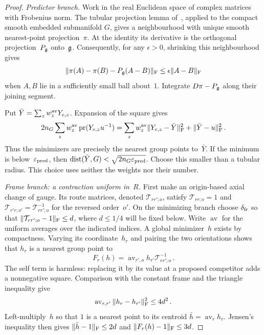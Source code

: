 \begin{proof}
\emph{Predictor branch.} Work in the real Euclidean space of complex matrices with Frobenius norm. The tubular projection lemma of~\cite[p.~153, Lemma]{Foote1984}, applied to the compact smooth embedded submanifold $G$, gives a neighbourhood with unique smooth nearest-point projection~$\pi$. At the identity its derivative is the orthogonal projection~$P_{\mathfrak{g}}$ onto~$\mathfrak{g}$. Consequently, for any $\epsilon>0$, shrinking this neighbourhood gives
\begin{equation}\label{eq:B-projection}
\|\pi(A)-\pi(B)-P_{\mathfrak{g}}(A-B)\|_{\rm F}\le\epsilon\|A-B\|_{\rm F}
\end{equation}
when $A,B$ lie in a sufficiently small ball about~$1$. Integrate $D\pi-P_{\mathfrak{g}}$ along their joining segment.

Put $\bar Y=\sum_z w_z^{\rm av}Y_{e,z}$. Expansion of the square gives
\begin{equation*}
2n_G\sum_z w_z^{\rm av}\operatorname{pr}(Y_{e,z}u^{-1})
=\sum_z w_z^{\rm av}\|Y_{e,z}-\bar Y\|_{\rm F}^2+\|\bar Y-u\|_{\rm F}^2\,.
\end{equation*}
Thus the minimizers are precisely the nearest group points to~$\bar Y$. If the minimum is below~$\varepsilon_{\rm pred}$, then $\operatorname{dist}(\bar Y,G)<\sqrt{2n_G\varepsilon_{\rm pred}}$. Choose this smaller than a tubular radius. This choice uses neither the weights nor their number.

\emph{Frame branch: a contraction uniform in~$R$.} First make an origin-based axial change of gauge. Its route matrices, denoted $\mathcal T_{rr';o}$, satisfy $\mathcal T_{rr;o}=1$ and $\mathcal T_{r'r;o'}=\mathcal T_{rr';o}^{-1}$ for the reversed order~$o'$. On the minimizing branch choose $\delta_{\rm fr}$ so that $\|\mathcal T_{rr';o}-1\|_{\rm F}\le d$, where $d\le1/4$ will be fixed below. Write $\operatorname{av}$ for the uniform averages over the indicated indices. A global minimizer~$h$ exists by compactness. Varying its coordinate~$h_r$ and pairing the two orientations shows that $h_r$ is a nearest group point to
\begin{equation*}
F_r(h)=\operatorname{av}_{r',o}h_{r'}\mathcal T_{rr';o}^{-1}\,.
\end{equation*}
The self term is harmless: replacing it by its value at a proposed competitor adds a nonnegative square. Comparison with the constant frame and the triangle inequality give
\begin{equation*}
\operatorname{av}_{r,r'}\|h_r-h_{r'}\|_{\rm F}^2\le4d^2\,.
\end{equation*}
Left-multiply~$h$ so that $1$ is a nearest point to its centroid $\bar h=\operatorname{av}_rh_r$. Jensen's inequality then gives $\|\bar h-1\|_{\rm F}\le2d$ and $\|F_r(h)-1\|_{\rm F}\le3d$.


\end{proof}
